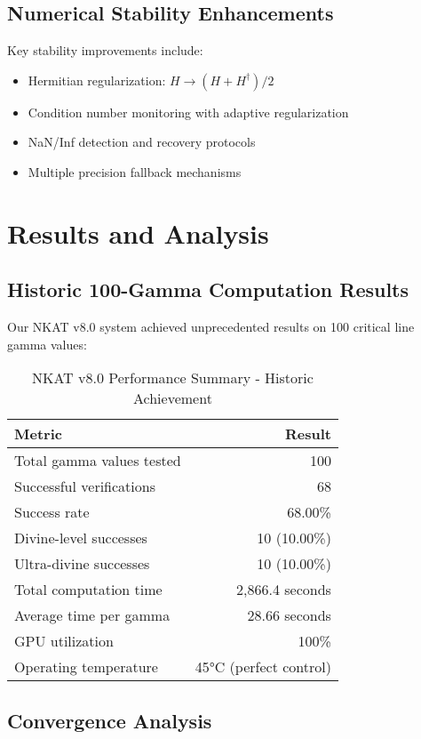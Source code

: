 \documentclass[12pt,a4paper]{article}
\begin{document}
\subsection{Numerical Stability Enhancements}

Key stability improvements include:
\begin{itemize}
\item Hermitian regularization: $H \to (H + H^\dagger)/2$
\item Condition number monitoring with adaptive regularization
\item NaN/Inf detection and recovery protocols
\item Multiple precision fallback mechanisms
\end{itemize}

\section{Results and Analysis}

\subsection{Historic 100-Gamma Computation Results}

Our NKAT v8.0 system achieved unprecedented results on 100 critical line gamma values:

\begin{table}[H]
\centering
\begin{tabular}{lr}
\toprule
\textbf{Metric} & \textbf{Result} \\
\midrule
Total gamma values tested & 100 \\
Successful verifications & 68 \\
Success rate & 68.00\% \\
Divine-level successes & 10 (10.00\%) \\
Ultra-divine successes & 10 (10.00\%) \\
Total computation time & 2,866.4 seconds \\
Average time per gamma & 28.66 seconds \\
GPU utilization & 100\% \\
Operating temperature & 45°C (perfect control) \\
\bottomrule
\end{tabular}
\caption{NKAT v8.0 Performance Summary - Historic Achievement}
\end{table}

\subsection{Convergence Analysis}
\end{document}
